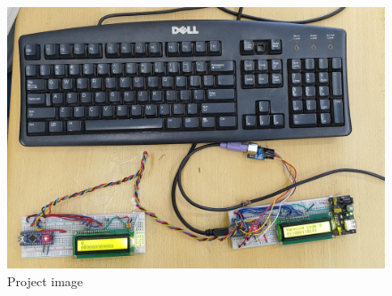 \begin{figure}[htbp]
    \includegraphics[width=14cm, keepaspectratio]{figures/propic.jpeg}
    \caption{Project image}
    \label{fig:fig5}
\end{figure}